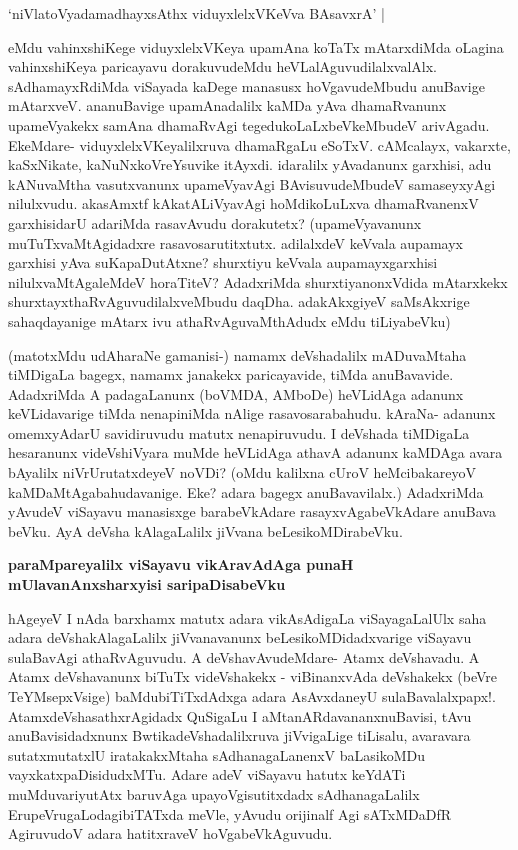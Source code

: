 \begin{shloka}
`niVlatoVyadamadhayxsAthx viduyxlelxVKeVva BAsavxrA' |\label{166}
\end{shloka}

eMdu vahinxshiKege viduyxlelxVKeya upamAna koTaTx mAtarxdiMda oLagina vahinxshiKeya paricayavu dorakuvudeMdu heVLalAguvudilalxvalAlx. sAdhamayxRdiMda viSayada kaDege manasusx hoVgavudeMbudu anuBavige mAtarxveV. ananuBavige upamAnadalilx kaMDa yAva dhamaRvanunx upameVyakekx samAna dhamaRvAgi tegedukoLaLxbeVkeMbudeV arivAgadu. EkeMdare- viduyxlelxVKeyalilxruva dhamaRgaLu eSoTxV. cAMcalayx, vakarxte, kaSxNikate, kaNuNxkoVreYsuvike itAyxdi. idaralilx yAvadanunx garxhisi, adu kANuvaMtha vasutxvanunx upameVyavAgi BAvisuvudeMbudeV samaseyxyAgi nilulxvudu. akasAmxtf kAkatALiVyavAgi hoMdikoLuLxva dhamaRvanenxV garxhisidarU adariMda rasavAvudu dorakutetx? (upameVyavanunx muTuTxvaMtAgidadxre rasavosarutitxtutx. adilalxdeV keVvala aupamayx garxhisi yAva suKapaDutAtxne? shurxtiyu keVvala aupamayxgarxhisi nilulxvaMtAgaleMdeV horaTiteV? AdadxriMda shurxtiyanonxVdida mAtarxkekx shurxtayxthaRvAguvudilalxveMbudu daqDha. adakAkxgiyeV saMsAkxrige sahaqdayanige mAtarx ivu athaRvAguvaMthAdudx eMdu tiLiyabeVku)

(matotxMdu udAharaNe gamanisi-) namamx deVshadalilx mADuvaMtaha tiMDigaLa bagegx, namamx janakekx paricayavide, tiMda anuBavavide. AdadxriMda A padagaLanunx (boVMDA, AMboDe) heVLidAga adanunx keVLidavarige tiMda nenapiniMda nAlige rasavosarabahudu. kAraNa- adanunx omemxyAdarU savidiruvudu matutx nenapiruvudu. I deVshada tiMDigaLa hesaranunx videVshiVyara muMde heVLidAga athavA adanunx kaMDAga avara bAyalilx niVrUrutatxdeyeV noVDi? (oMdu kalilxna cUroV heMcibakareyoV kaMDaMtAgabahudavanige. Eke? adara bagegx anuBavavilalx.) AdadxriMda yAvudeV viSayavu manasisxge barabeVkAdare rasayxvAgabeVkAdare anuBava beVku. AyA deVsha kAlagaLalilx jiVvana beLesikoMDirabeVku.

\noindent
{\bf\large{paraMpareyalilx viSayavu vikAravAdAga punaH mUlavanAnxsharxyisi saripaDisabeVku}}

hAgeyeV I nAda barxhamx matutx adara vikAsAdigaLa viSayagaLalUlx saha adara deVshakAlagaLalilx jiVvanavanunx beLesikoMDidadxvarige viSayavu sulaBavAgi athaRvAguvudu. A deVshavAvudeMdare- Atamx deVshavadu. A Atamx deVshavanunx biTuTx videVshakekx - viBinanxvAda deVshakekx (beVre TeYMsepxVsige) baMdubiTiTxdAdxga adara AsAvxdaneyU sulaBavalalxpapx!. AtamxdeVshasathxrAgidadx QuSigaLu I aMtanARdavananxnuBavisi, tAvu anuBavisidadxnunx BwtikadeVshadalilxruva jiVvigaLige tiLisalu, avaravara sutatxmutatxlU iratakakxMtaha sAdhanagaLanenxV baLasikoMDu vayxkatxpaDisidudxMTu. Adare adeV viSayavu hatutx keYdATi muMduvariyutAtx baruvAga upayoVgisutitxdadx sAdhanagaLalilx ErupeVrugaLodagibiTATxda meVle, yAvudu orijinalf Agi sATxMDaDfR AgiruvudoV adara hatitxraveV hoVgabeVkAguvudu.

